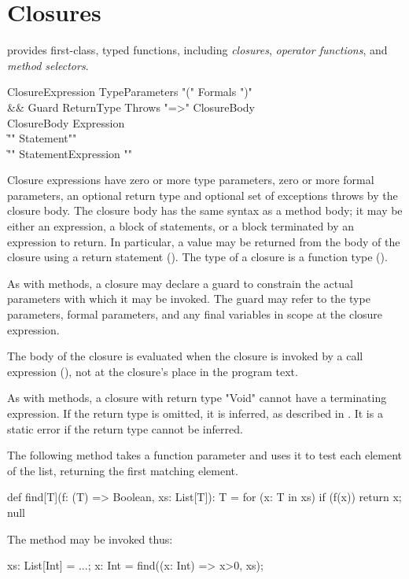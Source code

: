 \section{Closures}
\label{Closures}

\Xten{} provides first-class, typed functions, including
\emph{closures},
\emph{operator functions},
and \emph{method selectors}.

\begin{grammar}
ClosureExpression \:
        TypeParameters\opt
        \xcd"("
        Formals\opt
        \xcd")"
\\ &&
        Guard\opt
        ReturnType\opt
        Throws\opt
        \xcd"=>" ClosureBody \\
ClosureBody \:
        Expression \\
        \| \xcd"{" Statement\star \xcd"}" \\
        \| \xcd"{" Statement\star Expression \xcd"}" \\
\end{grammar}

Closure expressions have zero or more type parameters, zero or more
formal parameters, an optional return type and optional set of
exceptions throws by the closure body.  The closure body has the same
syntax as a method body; it may be either an expression, a block of
statements, or a block terminated by an expression to return. In
particular, a value may be returned from the body of the closure using
a return statement (). The type of a closure is a
function type ().

\label{ClosureGuard}

As with methods, a closure may declare a guard to
constrain the actual parameters with which it may be invoked.
The guard may refer to the type parameters, formal parameters,
and any final variables in scope at the closure expression.

The body of the closure is evaluated when the closure is
invoked by a call expression (), not at the closure's
place in the program text.

As with methods, a closure with return type \xcd"Void" cannot
have a terminating expression. 
If the return type is omitted, it is inferred, as described in
.
It is a static error if the return type cannot be inferred. 


\begin{example}
The following method takes a function parameter and uses it to
test each element of the list, returning the first matching
element.
\begin{xten}
def find[T](f: (T) => Boolean, xs: List[T]): T = {
  for (x: T in xs)
    if (f(x)) return x;
  null
}
\end{xten}

The method may be invoked thus:
\begin{xten}
xs: List[Int] = ...;
x: Int = find((x: Int) => x>0, xs);
\end{xten}
\end{example}

